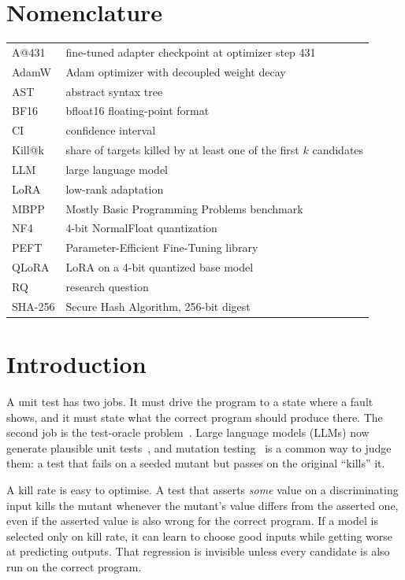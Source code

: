 \documentclass[10pt,conference,letterpaper]{IEEEtran}
\makeatletter
\newcommand{\killk}[1]{Kill@#1}
\makeatother
\begin{document}
\section*{Nomenclature}
{\small
\noindent\begin{tabular}{@{}p{}@{}p{}@{}}
A@431 & fine-tuned adapter checkpoint at optimizer step 431\\
AdamW & Adam optimizer with decoupled weight decay\\
AST & abstract syntax tree\\
BF16 & bfloat16 floating-point format\\
CI & confidence interval\\
\killk{k} & share of targets killed by at least one of the first $k$ candidates\\
LLM & large language model\\
LoRA & low-rank adaptation\\
MBPP & Mostly Basic Programming Problems benchmark\\
NF4 & 4-bit NormalFloat quantization\\
PEFT & Parameter-Efficient Fine-Tuning library\\
QLoRA & LoRA on a 4-bit quantized base model\\
RQ & research question\\
SHA-256 & Secure Hash Algorithm, 256-bit digest\\
\end{tabular}}

\section{Introduction}

A unit test has two jobs. It must drive the program to a state where a fault shows,
and it must state what the correct program should produce there. The second job is the
test-oracle problem~\cite{barr2015oracle}. Large language models (LLMs) now generate
plausible unit tests~\cite{schafer2024llmunit,lemieux2023codamosa,wang2024testingsurvey},
and mutation testing~\cite{jia2011mutation,papadakis2019mutation} is a common way to
judge them: a test that fails on a seeded mutant but passes on the original
``kills'' it.

A kill rate is easy to optimise. A test that asserts \emph{some} value on a
discriminating input kills the mutant whenever the mutant's value differs from the
asserted one, even if the asserted value is also wrong for the correct program. If a
model is selected only on kill rate, it can learn to choose good inputs while getting
worse at predicting outputs. That regression is invisible unless every candidate is
also run on the correct program.
\end{document}
